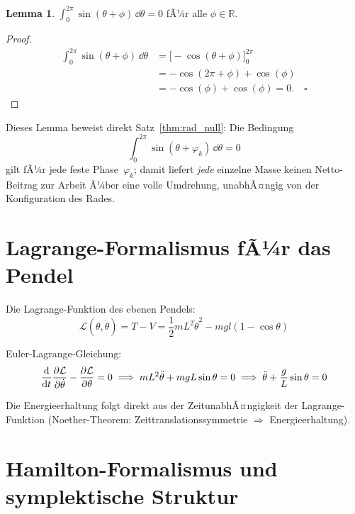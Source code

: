 ﻿\documentclass[12pt, a4paper]{report}
\theoremstyle{definition}
\newtheorem{lemma}[theorem]{Lemma}
\theoremstyle{remark}
\begin{document}
\begin{lemma}
  \label{lem:sin_integral}
  $\displaystyle\int_0^{2\pi} \sin(\theta + \phi)\,\dd\theta = 0$ fÃ¼r alle $\phi \in \mathbb{R}$.
\end{lemma}

\begin{proof}
  \begin{align*}
    \int_0^{2\pi}\sin(\theta+\phi)\,\dd\theta
      &= \bigl[-\cos(\theta+\phi)\bigr]_0^{2\pi} \\
      &= -\cos(2\pi+\phi) + \cos(\phi) \\
      &= -\cos(\phi)+\cos(\phi) = 0. \quad\square
  \end{align*}
\end{proof}

Dieses Lemma beweist direkt Satz~\ref{thm:rad_null}: Die Bedingung
\begin{equation*}
  \int_0^{2\pi}\sin(\theta+\varphi_k)\,\dd\theta = 0
\end{equation*}
gilt fÃ¼r jede feste Phase~$\varphi_k$; damit liefert \emph{jede} einzelne Masse
keinen Netto-Beitrag zur Arbeit Ã¼ber eine volle Umdrehung, unabhÃ¤ngig von der
Konfiguration des Rades.

\section{Lagrange-Formalismus fÃ¼r das Pendel}

Die Lagrange-Funktion des ebenen Pendels:
\begin{equation}
  \mathcal{L}(\theta, \dot\theta) = T - V
  = \frac{1}{2}mL^2\dot\theta^2 - mgl(1 - \cos\theta)
\end{equation}

Euler-Lagrange-Gleichung:
\begin{equation}
  \dv{}{t}\pdv{\mathcal{L}}{\dot\theta} - \pdv{\mathcal{L}}{\theta} = 0
  \implies mL^2\ddot\theta + mgL\sin\theta = 0
  \implies \ddot\theta + \frac{g}{L}\sin\theta = 0
\end{equation}

Die Energieerhaltung folgt direkt aus der ZeitunabhÃ¤ngigkeit der Lagrange-Funktion
(Noether-Theorem: Zeittranslationssymmetrie $\Rightarrow$ Energieerhaltung).

\section{Hamilton-Formalismus und symplektische Struktur}
\end{document}

